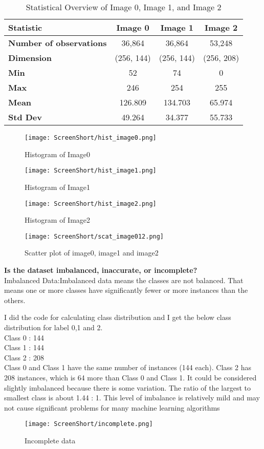 \documentclass[conference,12pt]{IEEEtran}
\begin{document}
\begin{table}[h!]
\centering
\caption{Statistical Overview of Image 0, Image 1, and Image 2}
\begin{tabular}{|p{2cm}|c|c|c|}
\hline
\textbf{Statistic} & \textbf{Image 0} & \textbf{Image 1} & \textbf{Image 2} \\
\hline
\textbf{Number of observations} & 36,864 & 36,864 & 53,248 \\
\textbf{Dimension} & (256, 144) & (256, 144) & (256, 208) \\
\textbf{Min} & 52 & 74 & 0 \\
\textbf{Max} & 246 & 254 & 255 \\
\textbf{Mean} & 126.809 & 134.703 & 65.974 \\
\textbf{Std Dev} & 49.264 & 34.377 & 55.733 \\
\hline
\end{tabular}
\label{tab:statistics}
\end{table}

\begin{figure}[h!]
    \centering
    \texttt{[image: ScreenShort/hist\_image0.png]}
    \caption{Histogram of Image0}
\end{figure}
\begin{figure}[h!]
    \centering
    \texttt{[image: ScreenShort/hist\_image1.png]}
    \caption{Histogram of Image1}
\end{figure}
\begin{figure}[h!]
    \centering
    \texttt{[image: ScreenShort/hist\_image2.png]}
    \caption{Histogram of Image2}
\end{figure}
\begin{figure}[h!]
    \centering
    \texttt{[image: ScreenShort/scat\_image012.png]}
    \caption{Scatter plot of image0, image1 and image2}
\end{figure}
\textbf{Is the dataset imbalanced, inaccurate, or incomplete?}\\

Imbalanced Data:Imbalanced data means the classes are not balanced. That means one or more classes have significantly fewer or more instances than the others.

I did the code for calculating class distribution and I get the below class distribution for label 0,1 and 2.\\
Class 0 : 144\\
Class 1 : 144\\
Class 2 : 208\\
Class 0 and Class 1 have the same number of instances (144 each). Class 2 has 208 instances, which is 64 more than Class 0 and Class 1. It could be considered slightly imbalanced because there is some variation. The ratio of the largest to smallest class is about 1.44 : 1. This level of imbalance is relatively mild and may not cause significant problems for many machine learning algorithms
\begin{figure}[h!]
    \centering
    \texttt{[image: ScreenShort/incomplete.png]}
    \caption{Incomplete data}
\end{figure}
\end{document}

